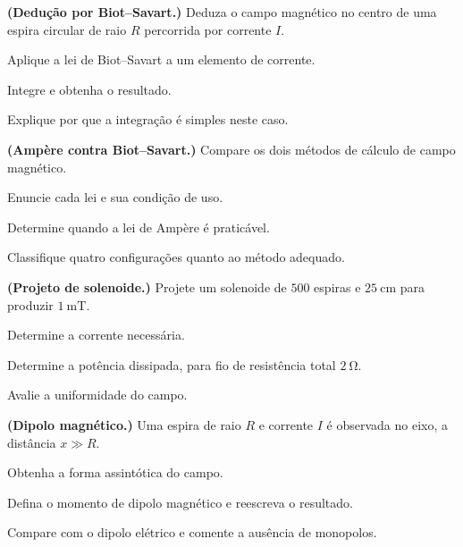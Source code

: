 \blocodesafio
\begin{questao}[4]{}

\textbf{(Dedução por Biot--Savart.)} Deduza o campo magnético no centro de uma
espira circular de raio $R$ percorrida por corrente $I$.
\begin{itensq}
\item Aplique a lei de Biot--Savart a um elemento de corrente.
\item Integre e obtenha o resultado.
\item Explique por que a integração é simples neste caso.
\end{itensq}


\end{questao}
\begin{questao}[4]{}

\textbf{(Ampère contra Biot--Savart.)} Compare os dois métodos de cálculo de
campo magnético.
\begin{itensq}
\item Enuncie cada lei e sua condição de uso.
\item Determine quando a lei de Ampère é praticável.
\item Classifique quatro configurações quanto ao método adequado.
\end{itensq}


\end{questao}
\begin{questao}[4]{}

\textbf{(Projeto de solenoide.)} Projete um solenoide de $500$ espiras e
$\SI{25}{\centi\meter}$ para produzir $\SI{1}{\milli\tesla}$.
\begin{itensq}
\item Determine a corrente necessária.
\item Determine a potência dissipada, para fio de resistência total
      $\SI{2}{\ohm}$.
\item Avalie a uniformidade do campo.
\end{itensq}


\end{questao}
\begin{questao}[4]{}

\textbf{(Dipolo magnético.)} Uma espira de raio $R$ e corrente $I$ é observada
no eixo, a distância $x\gg R$.
\begin{itensq}
\item Obtenha a forma assintótica do campo.
\item Defina o momento de dipolo magnético e reescreva o resultado.
\item Compare com o dipolo elétrico e comente a ausência de monopolos.
\end{itensq}


\end{questao}
